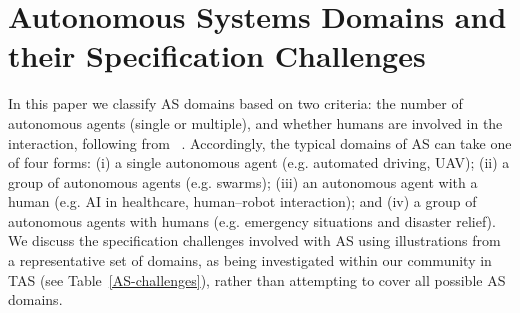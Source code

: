 \documentclass[sigconf,nonacm]{acmart}%
\begin{document}
	\section{Autonomous Systems Domains and their Specification Challenges}\label{as-domains}
	In this paper we classify AS domains based on two criteria: the number of autonomous agents (single or multiple), and whether humans are involved in the interaction, following from ~\cite{Schneiders2022}. Accordingly, the typical domains of AS can take one of four forms: (i) a single autonomous agent (e.g. automated driving, UAV); (ii) a group of autonomous agents (e.g. swarms); (iii) an autonomous agent with a human (e.g. AI in healthcare, human–robot interaction); and (iv) a group of autonomous agents with humans (e.g. emergency situations and disaster relief). We discuss the specification challenges involved with AS using illustrations from a representative set of domains, as being investigated within our community in TAS (see Table~\ref{AS-challenges}), rather than attempting to cover all possible AS domains. 
%
	
\end{document}

